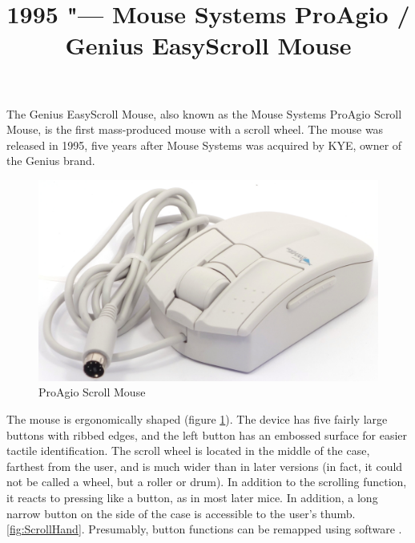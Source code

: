 \documentclass[11pt, a4paper]{article}
\begin{document}
\title{1995 "--- Mouse Systems ProAgio / Genius EasyScroll Mouse}
\date{}
\maketitle
{}
The Genius EasyScroll Mouse, also known as the Mouse Systems ProAgio Scroll Mouse, is the first mass-produced mouse with a scroll wheel. The mouse was released in 1995, five years after Mouse Systems was acquired by KYE, owner of the Genius brand.

\begin{figure}[h]
    \centering
    \includegraphics[scale=0.5]{1995_pro_agio_scroll_mouse/pic_30.jpg}
    \caption{ProAgio Scroll Mouse}
    \label{fig:ScrollPic}
\end{figure}


The mouse is ergonomically shaped (figure \ref{fig:ScrollPic}). The device has five fairly large buttons with ribbed edges, and the left button has an embossed surface for easier tactile identification. The scroll wheel is located in the middle of the case, farthest from the user, and is much wider than in later versions (in fact, it could not be called a wheel, but a roller or drum). In addition to the scrolling function, it reacts to pressing like a button, as in most later mice. In addition, a long narrow button on the side of the case is accessible to the user's thumb. \ref{fig:ScrollHand}. Presumably, button functions can be remapped using software \cite{yt}.
\end{document}
